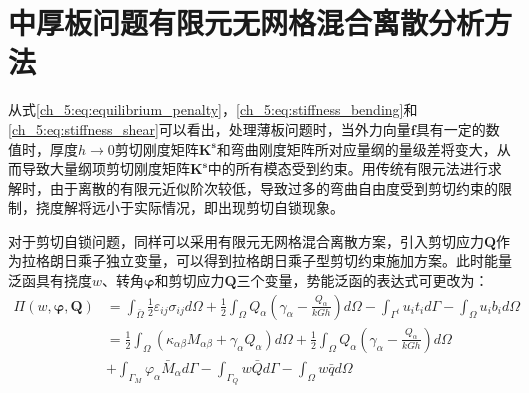 \section{中厚板问题有限元无网格混合离散分析方法} 
从式\eqref{ch_5:eq:equilibrium_penalty}，\eqref{ch_5:eq:stiffness_bending}和\eqref{ch_5:eq:stiffness_shear}可以看出，处理薄板问题时，当外力向量$\boldsymbol{f}$具有一定的数值时，厚度$h\rightarrow 0$剪切刚度矩阵$\boldsymbol{K^s}$和弯曲刚度矩阵所对应量纲的量级差将变大，从而导致大量纲项剪切刚度矩阵$\boldsymbol{K^s}$中的所有模态受到约束。用传统有限元法进行求解时，由于离散的有限元近似阶次较低，导致过多的弯曲自由度受到剪切约束的限制，挠度解将远小于实际情况，即出现剪切自锁现象。  

对于剪切自锁问题，同样可以采用有限元无网格混合离散方案，引入剪切应力$\boldsymbol{Q}$作为拉格朗日乘子独立变量，可以得到拉格朗日乘子型剪切约束施加方案。此时能量泛函具有挠度$w$、转角$\boldsymbol{\varphi}$和剪切应力$\boldsymbol{Q}$三个变量，势能泛函的表达式可更改为：
\begin{equation}\label{ch_5:eq:potential_energy_mixed}
    \begin{split} 
        \Pi(w,\boldsymbol{\varphi},\boldsymbol{Q})&=\int_{\bar\Omega}\frac{1}{2}\varepsilon_{ij}\sigma_{ij} d\Omega+\frac{1}{2}\int_{\Omega}Q_{\alpha}(\gamma_{\alpha}-\frac{Q_{\alpha}}{kGh})d\Omega-\int_{\Gamma^{t}} u_{i}t_{i}d\Gamma-\int_{\Omega} u_{i}b_{i}d\Omega\\
        &=\frac{1}{2}\int_{\Omega}(\kappa_{\alpha \beta}M_{\alpha \beta}+\gamma_{\alpha}Q_{\alpha})d\Omega+\frac{1}{2}\int_{\Omega}Q_{\alpha}(\gamma_{\alpha}-\frac{Q_{\alpha}}{kGh})d\Omega\\
        &+\int_{\Gamma_{M}}\varphi_{\alpha}{\bar{M}_{\alpha}}d\Gamma-\int_{\Gamma_{Q}}{w}\bar {Q}d\Gamma-\int_{\Omega} w\bar{q}d\Omega
    \end{split}
\end{equation}

